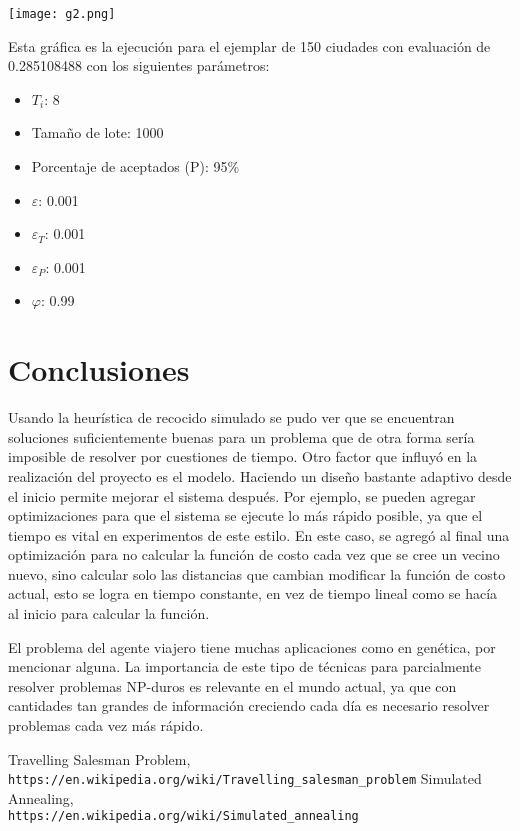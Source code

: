 \documentclass[12px]{article}
\begin{document}
\texttt{[image: g2.png]}

Esta gráfica es la ejecución para el ejemplar de 150 ciudades con evaluación de 0.285108488 con los siguientes parámetros:\\
\begin{itemize}
\item $T_i$: 8
\item Tamaño de lote: 1000
\item Porcentaje de aceptados (P): 95\%
\item $\varepsilon$: 0.001
\item $\varepsilon_T$: 0.001
\item $\varepsilon_P$: 0.001
\item $\varphi$: 0.99
\end{itemize}

\section{Conclusiones}
Usando la heurística de recocido simulado se pudo ver que se encuentran soluciones suficientemente buenas para un problema que de otra forma sería imposible de resolver por cuestiones de tiempo. Otro factor que influyó en la realización del proyecto es el modelo. Haciendo un diseño bastante adaptivo desde el inicio permite mejorar el sistema después. Por ejemplo, se pueden agregar optimizaciones para que el sistema se ejecute lo más rápido posible, ya que el tiempo es vital en experimentos de este estilo. En este caso, se agregó al final una optimización para no calcular la función de costo cada vez que se cree un vecino nuevo, sino calcular solo las distancias que cambian modificar la función de costo actual, esto se logra en tiempo constante, en vez de tiempo lineal como se hacía al inicio para calcular la función. \\ \par
El problema del agente viajero tiene muchas aplicaciones como en genética, por mencionar alguna. La importancia de este tipo de técnicas para parcialmente resolver problemas NP-duros es relevante en el mundo actual, ya que con cantidades tan grandes de información creciendo cada día es necesario resolver problemas cada vez más rápido.

\begin{thebibliography}{9}
Travelling Salesman Problem,\\
\texttt{https://en.wikipedia.org/wiki/Travelling\_salesman\_problem}
Simulated Annealing,\\
\texttt{https://en.wikipedia.org/wiki/Simulated\_annealing}
\end{thebibliography}
\end{document}
